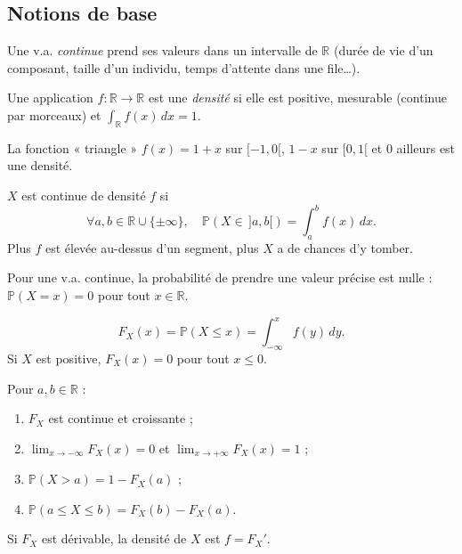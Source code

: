 \documentclass[11pt,a4paper]{article}
\renewcommand{\P}{\mathbb{P}}
\newcommand{\R}{\mathbb{R}}
\newcommand{\1}{\mathbf{1}}
\begin{document}
\subsection{Notions de base}

Une v.a. \emph{continue} prend ses valeurs dans un intervalle de $\R$ (durée de vie d'un composant, taille d'un individu, temps d'attente dans une file\dots).

\begin{definition}
Une application $f:\R\to\R$ est une \emph{densité} si elle est positive, mesurable (continue par morceaux) et $\displaystyle\int_{\R}f(x)\,dx=1$.
\end{definition}

\begin{exemple}
La fonction « triangle » $f(x)=1+x$ sur $[-1,0[$, $1-x$ sur $[0,1[$ et $0$ ailleurs est une densité.
\end{exemple}

\begin{proposition}
$X$ est continue de densité $f$ si
\[
\forall a,b\in\R\cup\{\pm\infty\},\quad \P(X\in\,]a,b[)=\int_a^b f(x)\,dx.
\]
Plus $f$ est élevée au-dessus d'un segment, plus $X$ a de chances d'y tomber.
\end{proposition}

\begin{remarque}
Pour une v.a. continue, la probabilité de prendre une valeur précise est nulle : $\P(X=x)=0$ pour tout $x\in\R$.
\end{remarque}

\begin{definition}
\[
F_X(x)=\P(X\le x)=\int_{-\infty}^{x}f(y)\,dy.
\]
Si $X$ est positive, $F_X(x)=0$ pour tout $x\le0$.
\end{definition}

\begin{proposition}[Propriétés]
Pour $a,b\in\R$ :
\begin{enumerate}
  \item $F_X$ est continue et croissante ;
  \item $\displaystyle\lim_{x\to-\infty}F_X(x)=0$ et $\displaystyle\lim_{x\to+\infty}F_X(x)=1$ ;
  \item $\P(X>a)=1-F_X(a)$ ;
  \item $\P(a\le X\le b)=F_X(b)-F_X(a)$.
\end{enumerate}
Si $F_X$ est dérivable, la densité de $X$ est $f=F_X'$.
\end{proposition}
\end{document}
